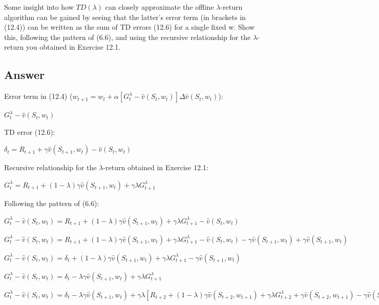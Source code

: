 \documentclass[11pt]{article}
\begin{document}
    Some insight into how $ TD(\lambda) $ can closely approximate the offline $\lambda$-return algorithm can be gained by seeing that the latter’s error term (in brackets in (12.4)) can be written as the sum of TD errors (12.6) for a single fixed w.
    Show this, following the pattern of (6.6), and using the recursive relationship for the $\lambda$-return you obtained in Exercise 12.1.

    \subsection*{Answer}

    \noindent Error term in (12.4) ($ w_{t+1} = w_t + \alpha [G_{t}^{\lambda} - \hat{v}(S_t, w_t)]\Delta \hat{v}(S_t, w_t)  $):

    \noindent $ G_{t}^{\lambda} - \hat{v}(S_t, w_t) $

    \hfill \break
    \noindent TD error (12.6):

    \noindent $ \delta_t = R_{t+1} + \gamma \hat{v}(S_{t+1}, w_t) - \hat{v}(S_t,w_t) $

    \hfill \break
    \noindent Recursive relationship for the $\lambda$-return obtained in Exercise 12.1:

    \noindent $ G_{t}^\lambda =  R_{t+1} + (1-\lambda) \gamma \hat{v}(S_{t+1},w_{t}) +  \gamma \lambda G_{t+1}^\lambda $

    \hfill \break
    \noindent Following the pattern of (6.6):

    \noindent $ G_{t}^{\lambda} - \hat{v}(S_t, w_t) = R_{t+1} + (1-\lambda) \gamma \hat{v}(S_{t+1},w_{t}) +  \gamma \lambda G_{t+1}^\lambda - \hat{v}(S_t, w_t) $

    \noindent $ G_{t}^{\lambda} - \hat{v}(S_t, w_t) = R_{t+1}  + (1-\lambda) \gamma \hat{v}(S_{t+1},w_{t}) +  \gamma \lambda G_{t+1}^\lambda - \hat{v}(S_t, w_t) - \gamma \hat{v}(S_{t+1}, w_t) + \gamma \hat{v}(S_{t+1}, w_t) $

    \noindent $ G_{t}^{\lambda} - \hat{v}(S_t, w_t) = \delta_{t} + (1-\lambda) \gamma \hat{v}(S_{t+1},w_{t}) +  \gamma \lambda G_{t+1}^\lambda - \gamma \hat{v}(S_{t+1}, w_t) $

    \noindent $ G_{t}^{\lambda} - \hat{v}(S_t, w_t) = \delta_{t} -\lambda \gamma \hat{v}(S_{t+1},w_{t}) +  \gamma \lambda G_{t+1}^\lambda $

    \noindent $ G_{t}^{\lambda} - \hat{v}(S_t, w_t) = \delta_{t} -\lambda \gamma \hat{v}(S_{t+1},w_{t}) +  \gamma \lambda [R_{t+2} + (1-\lambda) \gamma \hat{v}(S_{t+2},w_{t+1}) +  \gamma \lambda G_{t+2}^\lambda + \gamma \hat{v}(S_{t+2},w_{t+1}) - \gamma \hat{v}(S_{t+2},w_{t+1})] $
\end{document}
